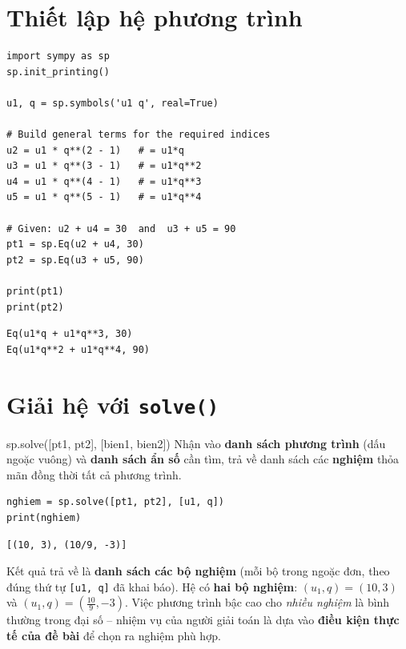\documentclass[12pt,a4paper]{report}
\begin{document}
\section{Thiết lập hệ phương trình}

\begin{lstlisting}[caption={Thiết lập hệ phương trình từ đề bài}]
import sympy as sp
sp.init_printing()

u1, q = sp.symbols('u1 q', real=True)

# Build general terms for the required indices
u2 = u1 * q**(2 - 1)   # = u1*q
u3 = u1 * q**(3 - 1)   # = u1*q**2
u4 = u1 * q**(4 - 1)   # = u1*q**3
u5 = u1 * q**(5 - 1)   # = u1*q**4

# Given: u2 + u4 = 30  and  u3 + u5 = 90
pt1 = sp.Eq(u2 + u4, 30)
pt2 = sp.Eq(u3 + u5, 90)

print(pt1)
print(pt2)
\end{lstlisting}

\begin{lstlisting}[style=outstyle,caption={Kết quả}]
Eq(u1*q + u1*q**3, 30)
Eq(u1*q**2 + u1*q**4, 90)
\end{lstlisting}

\section{Giải hệ với \texttt{solve()}}

\begin{syntaxbox}{sp.solve([pt1, pt2], [bien1, bien2])}
Nhận vào \textbf{danh sách phương trình} (dấu ngoặc vuông) và
\textbf{danh sách ẩn số} cần tìm, trả về danh sách các \textbf{nghiệm}
thỏa mãn đồng thời tất cả phương trình.
\end{syntaxbox}

\begin{lstlisting}[caption={Giải hệ phương trình tìm u1, q}]
nghiem = sp.solve([pt1, pt2], [u1, q])
print(nghiem)
\end{lstlisting}

\begin{lstlisting}[style=outstyle,numbers=none]
[(10, 3), (10/9, -3)]
\end{lstlisting}

\begin{infobox}
Kết quả trả về là \textbf{danh sách các bộ nghiệm} (mỗi bộ trong ngoặc
đơn, theo đúng thứ tự \texttt{[u1, q]} đã khai báo). Hệ có \textbf{hai
bộ nghiệm}: $(u_1, q) = (10, 3)$ và $(u_1, q) = (\tfrac{10}{9}, -3)$.
Việc phương trình bậc cao cho \emph{nhiều nghiệm} là bình thường trong
đại số -- nhiệm vụ của người giải toán là dựa vào \textbf{điều kiện
thực tế của đề bài} để chọn ra nghiệm phù hợp.
\end{infobox}
\end{document}
